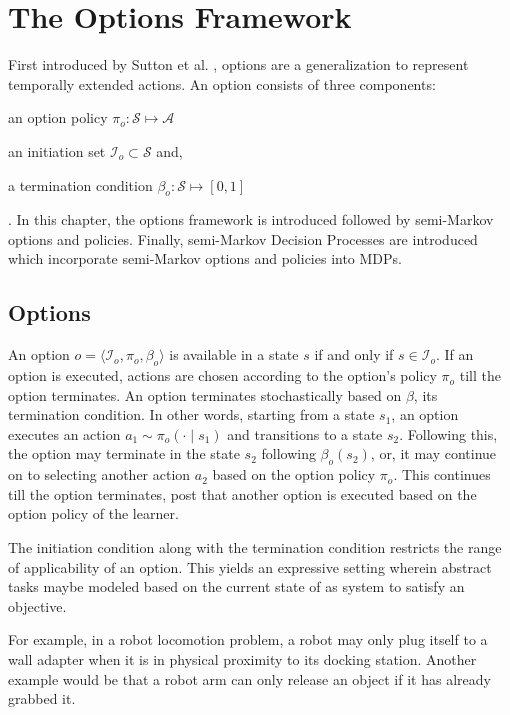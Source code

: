 \normallinespacing

\chapter{The Options Framework}

First introduced by Sutton et al. \cite{sutton_between_1999}, options are a generalization to represent temporally extended actions.
An option consists of three components:
\begin{inparaenum}[(a)]
    \item an option policy $\pi_o : \mathcal{S} \mapsto \mathcal{A}$
    \item an initiation set $\mathcal{I}_o \subset \mathcal{S}$ and,
    \item a termination condition $\beta_o : \mathcal{S} \mapsto [0, 1]$
\end{inparaenum}.
In this chapter, the options framework is introduced followed by semi-Markov options and policies. 
Finally, semi-Markov Decision Processes are introduced which incorporate semi-Markov options and policies into MDPs.

\section{Options}

An option $o = \langle \mathcal{I}_o, \pi_o, \beta_o \rangle$ is available in a state $s$ if and only if $s \in \mathcal{I}_o$.
If an option is executed, actions are chosen according to the option's policy $\pi_o$ till the option terminates.
An option terminates stochastically based on $\beta$, its termination condition.
In other words, starting from a state $s_1$, an option executes an action $a_1 \sim \pi_o(\cdot \mid s_1)$ and transitions to a state $s_2$.
Following this, the option may terminate in the state $s_2$ following $\beta_o(s_2)$, or, it may continue on to selecting another action $a_2$ based on the option policy $\pi_o$.
This continues till the option terminates, post that another option is executed based on the option policy of the learner.

The initiation condition along with the termination condition restricts the range of applicability of an option.
This yields an expressive setting wherein abstract tasks maybe modeled based on the current state of as system to satisfy an objective.

For example, in a robot locomotion problem, a robot may only plug itself to a wall adapter when it is in physical proximity to its docking station.
Another example would be that a robot arm can only release an object if it has already grabbed it.

